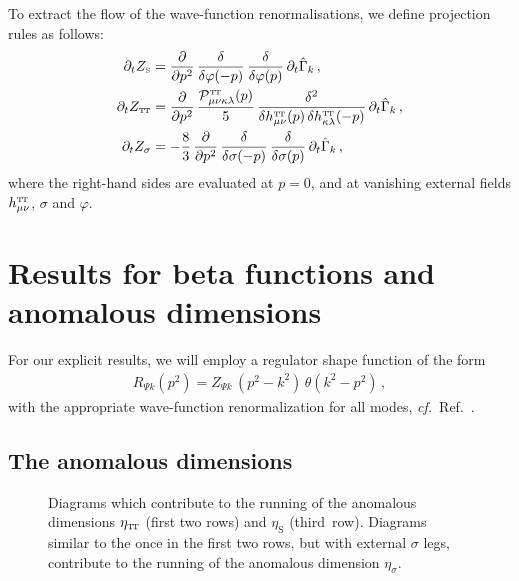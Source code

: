 \documentclass[11pt]{book}
\newcommand\TTspace{ -1pt }
\newcommand\TT{ \scriptscriptstyle{\mathrm{T\hspace{\TTspace}T}} }
\newcommand\hTTmunu{ h^{\scriptscriptstyle{\mathrm{T\hspace{\TTspace}T}}}_{\mu\nu} }
\newcommand\etaTT{ \eta_{\scriptscriptstyle{\mathrm{T\hspace{\TTspace}T}}} }
\newcommand\ZTT{ Z_{\scriptscriptstyle{\mathrm{T\hspace{\TTspace}T}}} }
\newcommand\etaS{ \eta_{\scriptscriptstyle{\mathrm{S}}} }
\newcommand\ZS{ Z_{\scriptscriptstyle{\mathrm{S}}} }
\newcommand\cf{\textit{cf.}\ }
\numberwithin{equation}{chapter}
\begin{document}
To extract the flow of the wave-function renormalisations, we define projection rules as follows:
\begin{align}
  \partial_t \ZS &=
  \frac{\partial}{\partial p^2} \, \frac{\delta}{\delta \varphi(-p)} \, \frac{\delta}{\delta \varphi(p)} \, \partial_t \hat \Gamma_k \,, \\
  \partial_t \ZTT &=
  \frac{\partial}{\partial p^2}  \, \frac{\mathcal P^{\TT}_{\mu \nu\kappa\lambda}(p)}{5}
  \, \frac{\delta^2}{\delta \hTTmunu (p) \, \delta h^{\TT}_{\kappa \lambda}(-p)} \, \partial_t \hat \Gamma_k
  \label{eq:projectZTT}\,, \\
  \partial_t Z_{\sigma} &= -\frac{8}{3} \,
  \frac{\partial}{\partial p^2} \, \frac{\delta}{\delta \sigma(-p)} \, \frac{\delta}{\delta \sigma(p)} \, \partial_t \hat \Gamma_k \,,
\end{align}
where the right-hand sides are evaluated at $p=0$,
and at vanishing external fields $\hTTmunu$, $\sigma$ and $\varphi$.


\section{Results for beta functions and anomalous dimensions}

For our explicit results, we will employ a regulator shape function of the form
\begin{align}
  \nonumber
  R_{\Psi k} \left( p^2\right) = Z_{\Psi k} \, (p^2-k^2) \, \theta(k^2-p^2) \,,
\end{align}
with the appropriate wave-function renormalization for all modes, \cf Ref.~\cite{Litim:2001up}.


\subsection{The anomalous dimensions}

\begin{figure}[p]
  \begin{center}
    
  \end{center}
  \caption{
    Diagrams which contribute to the running of the anomalous dimensions
    $\etaTT$ (first two rows) and $\etaS$ (third~row).
    Diagrams similar to the once in the first two rows, but with external $\sigma$ legs,
    contribute to the running of the anomalous dimension $\eta_{\sigma}$.
  }
  \label{fig:eta-diagrams-ch4}
\end{figure}
\end{document}
